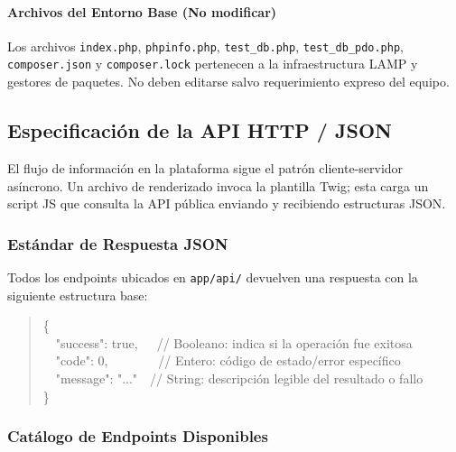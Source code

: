 \paragraph{Archivos del Entorno Base (No modificar)}
Los archivos \texttt{index.php}, \texttt{phpinfo.php}, \texttt{test\_db.php}, \texttt{test\_db\_pdo.php}, \texttt{composer.json} y \texttt{composer.lock} pertenecen a la infraestructura LAMP y gestores de paquetes. No deben editarse salvo requerimiento expreso del equipo.

\newpage
\subsection{Especificación de la API HTTP / JSON}

El flujo de información en la plataforma sigue el patrón cliente-servidor asíncrono. Un archivo de renderizado invoca la plantilla Twig; esta carga un script JS que consulta la API pública enviando y recibiendo estructuras JSON.

\subsubsection{Estándar de Respuesta JSON}
Todos los endpoints ubicados en \texttt{app/api/} devuelven una respuesta con la siguiente estructura base:

\begin{quote}
\small\ttfamily
\{\\
\ \ "success": true,\ \ \ // Booleano: indica si la operación fue exitosa\\
\ \ "code": 0,\ \ \ \ \ \ \ \ // Entero: código de estado/error específico\\
\ \ "message": "..."\ \ // String: descripción legible del resultado o fallo\\
\}
\end{quote}

\subsubsection{Catálogo de Endpoints Disponibles}

